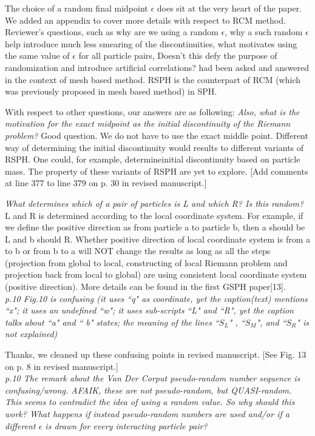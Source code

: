 \documentclass[10pt,a4paper]{article}
\begin{document}
The choice of a random final midpoint $\epsilon$ does sit at the very heart of the paper. We added an appendix to cover more details with respect to RCM method. Reviewer's questions, such as why are we using a random $\epsilon$, why a such random $\epsilon$ help introduce much less smearing of the discontinuities, what motivates using the same value of $\epsilon$ for all particle pairs, Doesn't this defy the purpose of randomization and introduce artificial correlations? had been asked and answered in the context of mesh based method. RSPH is the counterpart of RCM (which was previously proposed in mesh based method) in SPH.

With respect to other questions, our answers are as following: 
\textit{Also, what is the motivation for the exact midpoint as the initial discontinuity of the Riemann problem?}
Good question. We do not have to use the exact middle point. Different way of determining the initial discontinuity would results to different variants of RSPH. One could, for example, determineinitial discontinuity based on particle mass. The property of these variants of RSPH are yet to explore. [Add comments at line 377 to line 379 on p. 30 in revised manuscript.]

\textit{ What determines which of a pair of particles is L and which R? Is this random? }
L and R is determined according to the local coordinate system. For example, if we define the positive direction as from particle a to particle b, then a should be L and b should R. Whether positive direction of local coordinate system is from a to b or from b to a will NOT change the results as long as all the steps (projection from global to local, constructing of local Riemann problem and projection back from local to global) are using consistent local coordinate system (positive direction). More details can be found in the first GSPH paper[13].
\\[3pt]


\textit{p.10 Fig.10 is confusing (it uses ``q" as coordinate, yet the caption(text) mentions ``x"; it uses an undefined ``w"; it uses sub-scripts ``L" and ``R", yet the caption talks about ``a" and `` b" states; the meaning of the lines ``$S_L$" , ``$S_M$", and ``$S_R$" is not explained)}

Thanks, we cleaned up these confusing points in revised manuscript. 
[See Fig. 13 on p. 8 in revised manuscript.]
\\[3pt]

\textit{p.10 The remark about the Van Der Corput pseudo-random number sequence is confusing/wrong. AFAIK, these are not pseudo-random, but QUASI-random. This seems to contradict the idea of using a random value. So why should this work?
What happens if instead pseudo-random numbers are used and/or if a different $\epsilon$ is drawn for every interacting particle pair?}
\end{document}
